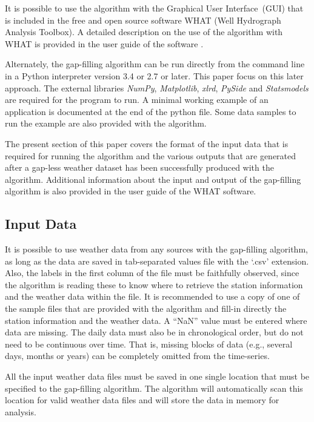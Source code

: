 \documentclass[TechnicalNoteMeteo.tex]{subfiles}
\begin{document}
It is possible to use the algorithm with the Graphical User Interface~(GUI) that is included in the free and open source software WHAT (Well Hydrograph Analysis Toolbox). A detailed description on the use of the algorithm with WHAT is provided in the user guide of the software \citep{gosselin_what_2015}.

Alternately, the gap-filling algorithm can be run directly from the command line in a Python interpreter version 3.4 or 2.7 or later. This paper focus on this later approach. The external libraries \emph{NumPy}, \emph{Matplotlib}, \emph{xlrd}, \emph{PySide} and \emph{Statsmodels} are required for the program to run. A minimal working example of an application is documented at the end of the python file. Some data samples to run the example are also provided with the algorithm.

The present section of this paper covers the format of the input data that is required for running the algorithm and the various outputs that are generated after a gap-less weather dataset has been successfully produced with the algorithm. Additional information about the input and output of the gap-filling algorithm is also provided in the user guide of the WHAT software.

\subsection{Input Data}\label{subsec:input}

It is possible to use weather data from any sources with the gap-filling algorithm, as long as the data are saved in tab-separated values file with the `.csv' extension. Also, the labels in the first column of the file must be faithfully observed, since the algorithm is reading these to know where to retrieve the station information and the weather data within the file. It is recommended to use a copy of one of the sample files that are provided with the algorithm and fill-in directly the station information and the weather data. A ``NaN'' value must be entered where data are missing. The daily data must also be in chronological order, but do not need to be continuous over time. That is, missing blocks of data (e.g., several days, months or years) can be completely omitted from the time-series. 

All the input weather data files must be saved in one single location that must be specified to the gap-filling algorithm. The algorithm will automatically scan this location for valid weather data files and will store the data in memory for analysis.
\end{document}
